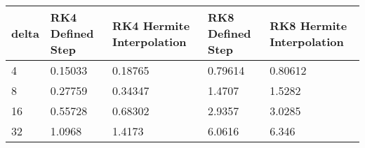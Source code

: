 \begin{tabular}{lllll}
delta & RK4 Defined Step & RK4 Hermite Interpolation & RK8 Defined Step & RK8 Hermite Interpolation \\ 
\hline 
4 & 0.15033 & 0.18765 & 0.79614 & 0.80612 \\ 
8 & 0.27759 & 0.34347 & 1.4707 & 1.5282 \\ 
16 & 0.55728 & 0.68302 & 2.9357 & 3.0285 \\ 
32 & 1.0968 & 1.4173 & 6.0616 & 6.346 \\ 
\hline 
\end{tabular}